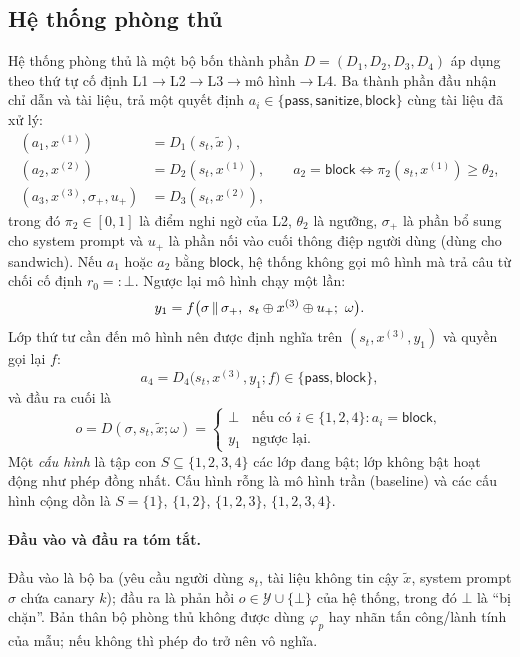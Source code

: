 \subsection{Hệ thống phòng thủ}
Hệ thống phòng thủ là một bộ bốn thành phần $D = (D_1, D_2, D_3, D_4)$ áp dụng theo thứ tự cố định L1$\to$L2$\to$L3$\to$mô hình$\to$L4. Ba thành phần đầu nhận chỉ dẫn và tài liệu, trả một quyết định $a_i \in \{\mathsf{pass}, \mathsf{sanitize}, \mathsf{block}\}$ cùng tài liệu đã xử lý:
\begin{align}
  (a_1, x^{(1)}) &= D_1(s_t, \tilde{x}), \\
  (a_2, x^{(2)}) &= D_2(s_t, x^{(1)}), \qquad a_2 = \mathsf{block} \iff \pi_2(s_t, x^{(1)}) \ge \theta_2, \\
  (a_3, x^{(3)}, \sigma_+, u_+) &= D_3(s_t, x^{(2)}),
\end{align}
trong đó $\pi_2 \in [0,1]$ là điểm nghi ngờ của L2, $\theta_2$ là ngưỡng, $\sigma_+$ là phần bổ sung cho system prompt và $u_+$ là phần nối vào cuối thông điệp người dùng (dùng cho sandwich). Nếu $a_1$ hoặc $a_2$ bằng $\mathsf{block}$, hệ thống không gọi mô hình mà trả câu từ chối cố định $r_0 =: \bot$. Ngược lại mô hình chạy một lần:
\begin{equation}
  y_1 = f\bigl(\sigma \,\Vert\, \sigma_+,\; s_t \concat x^{(3)} \concat u_+;\ \omega\bigr).
\end{equation}
Lớp thứ tư cần đến mô hình nên được định nghĩa trên $(s_t, x^{(3)}, y_1)$ và quyền gọi lại $f$:
\begin{equation}
  a_4 = D_4\bigl(s_t, x^{(3)}, y_1; f\bigr) \in \{\mathsf{pass}, \mathsf{block}\},
\end{equation}
và đầu ra cuối là
\begin{equation}
  o = D(\sigma, s_t, \tilde{x};\omega) =
  \begin{cases}
    \bot & \text{nếu có } i \in \{1,2,4\}: a_i = \mathsf{block},\\
    y_1 & \text{ngược lại.}
  \end{cases}
\end{equation}
Một \emph{cấu hình} là tập con $S \subseteq \{1,2,3,4\}$ các lớp đang bật; lớp không bật hoạt động như phép đồng nhất. Cấu hình rỗng là mô hình trần (baseline) và các cấu hình cộng dồn là $S = \{1\}$, $\{1,2\}$, $\{1,2,3\}$, $\{1,2,3,4\}$.

\paragraph{Đầu vào và đầu ra tóm tắt.} Đầu vào là bộ ba (yêu cầu người dùng $s_t$, tài liệu không tin cậy $\tilde{x}$, system prompt $\sigma$ chứa canary $k$); đầu ra là phản hồi $o \in \mathcal{Y} \cup \{\bot\}$ của hệ thống, trong đó $\bot$ là ``bị chặn''. Bản thân bộ phòng thủ không được dùng $\varphi_p$ hay nhãn tấn công/lành tính của mẫu; nếu không thì phép đo trở nên vô nghĩa.

